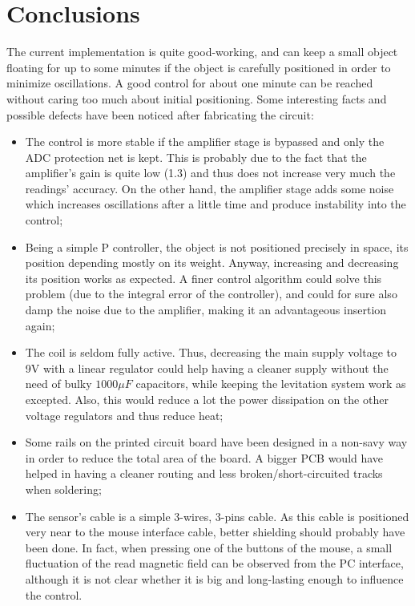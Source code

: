 \section{Conclusions}
The current implementation is quite good-working, and can keep a small object floating for up to some minutes if the object is carefully positioned in order to minimize oscillations. A good control for about one minute can be reached without caring too much about initial positioning. Some interesting facts and possible defects have been noticed after fabricating the circuit:

\begin{itemize}
\item{The control is more stable if the amplifier stage is bypassed and only the ADC protection net is kept. This is probably due to the fact that the amplifier's gain is quite low (1.3) and thus does not increase very much the readings' accuracy. On the other hand, the amplifier stage adds some noise which increases oscillations after a little time and produce instability into the control;}
\item{Being a simple P controller, the object is not positioned precisely in space, its position depending mostly on its weight. Anyway, increasing and decreasing its position works as expected. A finer control algorithm could solve this problem (due to the integral error of the controller), and could for sure also damp the noise due to the amplifier, making it an advantageous insertion again;}
\item{The coil is seldom fully active. Thus, decreasing the main supply voltage to 9V with a linear regulator could help having a cleaner supply without the need of bulky $1000\mu F$ capacitors, while keeping the levitation system work as excepted. Also, this would reduce a lot the power dissipation on the other voltage regulators and thus reduce heat;}
\item{Some rails on the printed circuit board have been designed in a non-savy way in order to reduce the total area of the board. A bigger PCB would have helped in having a cleaner routing and less broken/short-circuited tracks when soldering;}
\item{The sensor's cable is a simple 3-wires, 3-pins cable. As this cable is positioned very near to the mouse interface cable, better shielding should probably have been done. In fact, when pressing one of the buttons of the mouse, a small fluctuation of the read magnetic field can be observed from the PC interface, although it is not clear whether it is big and long-lasting enough to influence the control.}
\end{itemize}

